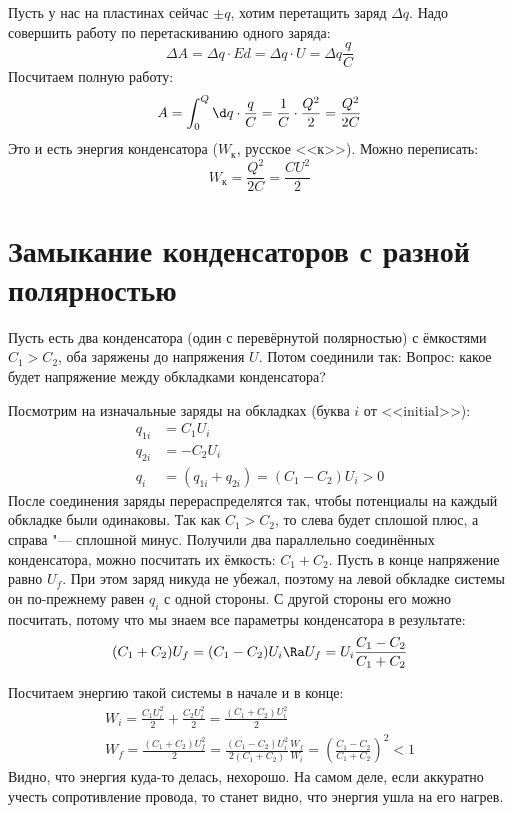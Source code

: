   Пусть у нас на пластинах сейчас $\pm q$, хотим перетащить заряд $\Delta q$.
  Надо совершить работу по перетаскиванию одного заряда:
  \[\Delta A=\Delta q \cdot E d = \Delta q \cdot U = \Delta q \frac q C\]
  Посчитаем полную работу:
  \[A = \int_0^Q \d q \cdot \frac q C = \frac 1C \cdot \frac{Q^2}{2} = \frac{Q^2}{2C}\]
  Это и есть энергия конденсатора ($W_к$, русское <<к>>).
  Можно переписать:
  \[W_к = \frac{Q^2}{2C} = \frac{CU^2}{2}\]

\section{Замыкание конденсаторов с разной полярностью}
  Пусть есть два конденсатора (один с перевёрнутой полярностью) с ёмкостями $C_1 > C_2$, оба заряжены до напряжения $U$.
  Потом соединили так:
    Вопрос: какое будет напряжение между обкладками конденсатора?

    Посмотрим на изначальные заряды на обкладках (буква $i$ от <<initial>>):
    \begin{align*}
      q_{1i} &= C_1 U_i \\
      q_{2i} &= -C_2 U_i \\
      q_i &= (q_{1i}+q_{2i}) = (C_1-C_2) U_i > 0
    \end{align*}
    После соединения заряды перераспределятся так, чтобы потенциалы на каждый обкладке были одинаковы.
    Так как $C_1>C_2$, то слева будет сплошой плюс, а справа "--- сплошной минус.
    Получили два параллельно соединённых конденсатора, можно посчитать их ёмкость: $C_1+C_2$.
    Пусть в конце напряжение равно $U_f$.
    При этом заряд никуда не убежал, поэтому на левой обкладке системы он по-прежнему равен $q_i$ с одной стороны.
    С другой стороны его можно посчитать, потому что мы знаем все параметры конденсатора в результате:
    \[ (C_1+C_2)U_f = (C_1-C_2)U_i \Ra U_f = U_i\frac{C_1-C_2}{C_1+C_2}\]

    Посчитаем энергию такой системы в начале и в конце:
    \begin{gather*}
    W_i = \frac{C_1U_i^2}{2} + \frac{C_2U_i^2}{2} = \frac{(C_1+C_2)U_i^2}{2} \\
    W_f = \frac{(C_1+C_2)U_f^2}{2} = \frac{(C_1-C_2)U_i^2}{2(C_1+C_2)}
    \frac{W_f}{W_i} = \left(\frac{C_1-C_2}{C_1+C_2}\right)^2 < 1
    \end{gather*}
    Видно, что энергия куда-то делась, нехорошо.
    На самом деле, если аккуратно учесть сопротивление провода, то станет видно, что энергия ушла на его нагрев.
